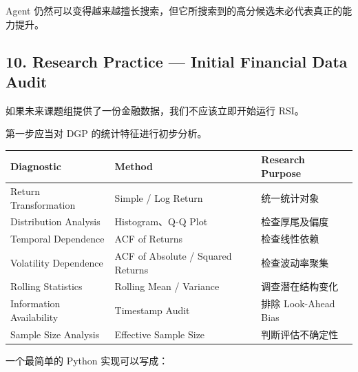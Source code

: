 Agent 仍然可以变得越来越擅长搜索，但它所搜索到的高分候选未必代表真正的能力提升。

\hypertarget{part-4-52-0680-research-practice-initial-financial-data-audit}{%
\subsection{10. Research Practice --- Initial Financial Data Audit}\label{part-4-52-0680-research-practice-initial-financial-data-audit}}

如果未来课题组提供了一份金融数据，我们不应该立即开始运行 RSI。

第一步应当对 DGP 的统计特征进行初步分析。

\begin{readertable}
\begin{longtable}[]{@{}
  >{\raggedright\arraybackslash}p{}
  >{\raggedright\arraybackslash}p{}
  >{\raggedright\arraybackslash}p{}@{}}
\toprule
Diagnostic & Method & Research Purpose \\
\midrule
\endhead
Return Transformation & Simple / Log Return & 统一统计对象 \\
Distribution Analysis & Histogram、Q-Q Plot & 检查厚尾及偏度 \\
Temporal Dependence & ACF of Returns & 检查线性依赖 \\
Volatility Dependence & ACF of Absolute / Squared Returns & 检查波动率聚集 \\
Rolling Statistics & Rolling Mean / Variance & 调查潜在结构变化 \\
Information Availability & Timestamp Audit & 排除 Look-Ahead Bias \\
Sample Size Analysis & Effective Sample Size & 判断评估不确定性 \\
\bottomrule
\end{longtable}
\end{readertable}

一个最简单的 Python 实现可以写成：

